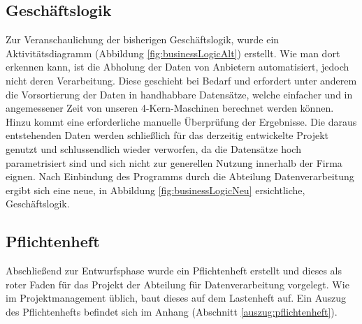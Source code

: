 \subsection{Geschäftslogik}
Zur Veranschaulichung der bisherigen Geschäftslogik, wurde ein Aktivitätsdiagramm (Abbildung \ref{fig:businessLogicAlt})
erstellt. Wie man dort erkennen kann, ist die Abholung der Daten von Anbietern automatisiert, jedoch nicht deren Verarbeitung.
Diese geschieht bei Bedarf und erfordert unter anderem die Vorsortierung der Daten
in handhabbare Datensätze, welche einfacher und in angemessener Zeit von unseren 4-Kern-Maschinen
berechnet werden können. Hinzu kommt eine erforderliche manuelle Überprüfung
der Ergebnisse. Die daraus entstehenden Daten werden schließlich für das derzeitig entwickelte Projekt
genutzt und schlussendlich wieder verworfen, da die Datensätze hoch parametrisiert
sind und sich nicht zur generellen Nutzung innerhalb der Firma eignen. Nach
Einbindung des Programms durch die Abteilung Datenverarbeitung ergibt sich eine
neue, in Abbildung \ref{fig:businessLogicNeu} ersichtliche, Geschäftslogik.\par



\subsection{Pflichtenheft}
Abschließend zur Entwurfsphase wurde ein Pflichtenheft erstellt und dieses als
roter Faden für das Projekt der Abteilung für Datenverarbeitung vorgelegt. Wie im
Projektmanagement üblich, baut dieses auf dem Lastenheft auf.
Ein Auszug des Pflichtenhefts befindet sich im Anhang (Abschnitt \ref{auszug:pflichtenheft}).
